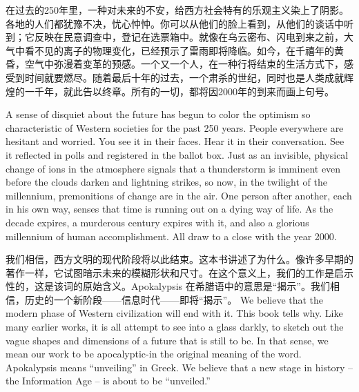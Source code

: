 \begin{paracol}{2}[]
\switchcolumn*
在过去的250年里，一种对未来的不安，给西方社会特有的乐观主义染上了阴影。各地的人们都犹豫不决，忧心忡忡。你可以从他们的脸上看到，从他们的谈话中听到；它反映在民意调查中，登记在选票箱中。就像在乌云密布、闪电到来之前，大气中看不见的离子的物理变化，已经预示了雷雨即将降临。如今，在千禧年的黄昏，空气中弥漫着变革的预感。一个又一个人，在一种行将结束的生活方式下，感受到时间就要燃尽。随着最后十年的过去，一个肃杀的世纪，同时也是人类成就辉煌的一千年，就此告以终章。所有的一切，都将因2000年的到来而画上句号。

\switchcolumn
A sense of disquiet about the future has begun to color the optimism so characteristic of Western societies for the past 250 years. People everywhere are hesitant and worried. You see it in their faces. Hear it in their conversation. See it reflected in polls and registered in the ballot box. Just as an invisible, physical change of ions in the atmosphere signals that a thunderstorm is imminent even before the clouds darken and lightning strikes, so now, in the twilight of the millennium, premonitions of change are in the air. One person after another, each in his own way, senses that time is running out on a dying way of life. As the decade expires, a murderous century expires with it, and also a glorious millennium of human accomplishment. All draw to a close with the year 2000. 

\switchcolumn*
我们相信，西方文明的现代阶段将以此结束。这本书讲述了为什么。像许多早期的著作一样，它试图暗示未来的模糊形状和尺寸。在这个意义上，我们的工作是启示性的，这是该词的原始含义。Apokalypsis 在希腊语中的意思是“揭示”。我们相信，历史的一个新阶段——信息时代——即将“揭示”。
\switchcolumn
We believe that the modern phase of Western civilization will end with it. This book tells why. Like many earlier works, it is all attempt to see into a glass darkly, to sketch out the vague shapes and dimensions of a future that is still to be. In that sense, we mean our work to be apocalyptic-in the original meaning of the word. Apokalypsis means ``unveiling'' in Greek. We believe that a new stage in history -- the Information Age -- is about to be ``unveiled.'' 
\end{paracol}

